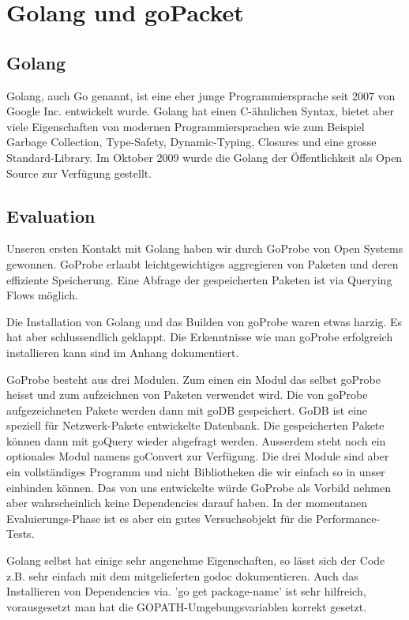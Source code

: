 \section{Golang und goPacket}
\label{sec:Golang und goPacket}

\subsection{Golang}
Golang, auch Go genannt, ist eine eher junge Programmiersprache seit 2007 von Google Inc. entwickelt wurde. Golang hat einen C-ähnlichen Syntax, bietet aber viele Eigenschaften von modernen Programmiersprachen wie zum Beispiel Garbage Collection, Type-Safety, Dynamic-Typing, Closures und eine grosse Standard-Library.
Im Oktober 2009 wurde die Golang der Öffentlichkeit als Open Source zur Verfügung gestellt.

\subsection{Evaluation}
Unseren ersten Kontakt mit Golang haben wir durch GoProbe von Open Systems gewonnen.
GoProbe erlaubt leichtgewichtiges aggregieren von Paketen und deren effiziente Speicherung. Eine Abfrage der gespeicherten Paketen ist via Querying Flows möglich.

Die Installation von Golang und das Builden von goProbe waren etwas harzig. Es hat aber schlussendlich geklappt. Die Erkenntnisse wie man goProbe erfolgreich installieren kann sind im Anhang dokumentiert.

GoProbe besteht aus drei Modulen. Zum einen ein Modul das selbst goProbe heisst und zum aufzeichnen von Paketen verwendet wird. Die von goProbe aufgezeichneten Pakete werden dann mit goDB gespeichert. GoDB ist eine speziell für Netzwerk-Pakete entwickelte Datenbank. Die gespeicherten Pakete können dann mit goQuery wieder abgefragt werden. Ausserdem steht noch ein optionales Modul namens goConvert zur Verfügung. Die drei Module sind aber ein vollständiges Programm und nicht Bibliotheken die wir einfach so in unser \tool einbinden können. Das von uns entwickelte \tool würde GoProbe als Vorbild nehmen aber wahrscheinlich keine Dependencies darauf haben. In der momentanen Evaluierungs-Phase ist es aber ein gutes Versuchsobjekt für die Performance-Tests.

Golang selbst hat einige sehr angenehme Eigenschaften, so lässt sich der Code z.B. sehr einfach mit dem mitgelieferten godoc dokumentieren. Auch das Installieren von Dependencies via. 'go get package-name' ist sehr hilfreich, vorausgesetzt man hat die GOPATH-Umgebungsvariablen korrekt gesetzt.